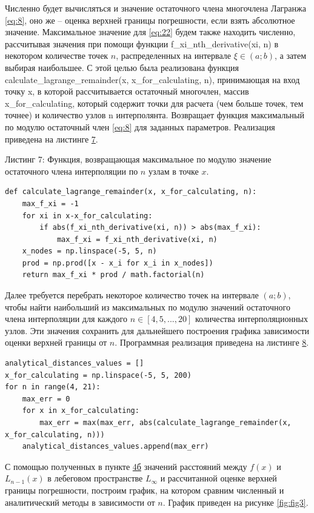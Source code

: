 Численно будет вычисляться и значение остаточного члена многочлена Лагранжа \eqref{eq:8}, оно же – оценка верхней границы погрешности, если взять абсолютное значение. Максимальное значение для \eqref{eq:22} будем также находить численно, рассчитывая значения при помощи функции f\_xi\_nth\_derivative(xi, n) в некотором количестве точек $n$, распределенных на интервале $\xi \in (a;b)$, а затем выбирая наибольшее. С этой целью была реализована функция calculate\_lagrange\_remainder(x, x\_for\_calculating, n), принимающая на вход точку x, в которой рассчитывается остаточный многочлен, массив x\_for\_calculating, который содержит точки для расчета (чем больше точек, тем точнее) и количество узлов n интерполянта. Возвращает функция максимальный по модулю остаточный член \eqref{eq:8} для заданных параметров. Реализация приведена на листинге \hyperref[lst:listing7]{7}.

Листинг 7: Функция, возвращающая максимальное по модулю значение остаточного члена интерполяции по $n$ узлам в точке $x$.
\begin{lstlisting}[label={lst:listing7}]
def calculate_lagrange_remainder(x, x_for_calculating, n):
    max_f_xi = -1
    for xi in x-x_for_calculating:
        if abs(f_xi_nth_derivative(xi, n)) > abs(max_f_xi):
            max_f_xi = f_xi_nth_derivative(xi, n)
    x_nodes = np.linspace(-5, 5, n)
    prod = np.prod([x - x_i for x_i in x_nodes])
    return max_f_xi * prod / math.factorial(n)
\end{lstlisting}

Далее требуется перебрать некоторое количество точек на интервале $(a;b)$, чтобы найти наибольший из максимальных по модулю значений остаточного члена интерполяции для каждого $n \in [4,5,...,20]$ количества интерполяционных узлов. Эти значения сохранить для дальнейшего построения графика зависимости оценки верхней границы от $n$. Программная реализация приведена на листинге \hyperref[lst:listing8]{8}.

\begin{lstlisting}[label={lst:listing8}]
analytical_distances_values = []
x_for_calculating = np.linspace(-5, 5, 200)
for n in range(4, 21):
    max_err = 0
    for x in x_for_calculating:
        max_err = max(max_err, abs(calculate_lagrange_remainder(x, x_for_calculating, n)))
    analytical_distances_values.append(max_err)
\end{lstlisting}

С помощью полученных в пункте \hyperref[z4b]{4б} значений расстояний между $f(x)$ и $L_{n−1}(x)$ в лебеговом пространстве $L_{\infty}$ и рассчитанной оценке верхней границы погрешности, построим график, на котором сравним численный и аналитический методы в зависимости от $n$. График приведен на рисунке \ref{fig:fig3}.

